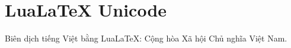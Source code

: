 \documentclass{article}
\begin{document}
\section*{LuaLaTeX Unicode}
Biên dịch tiếng Việt bằng LuaLaTeX: Cộng hòa Xã hội Chủ nghĩa Việt Nam.
\end{document}
